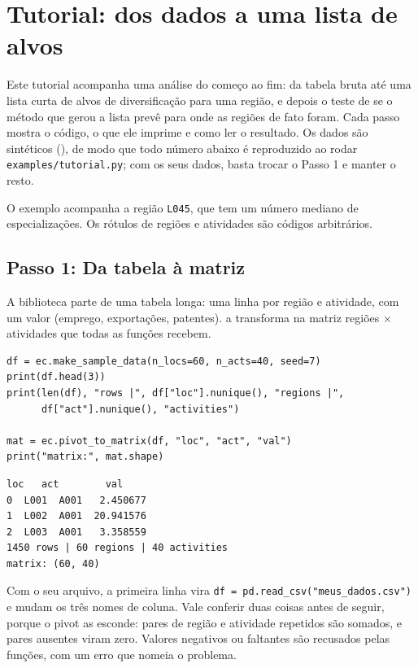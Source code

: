 \section{Tutorial: dos dados a uma lista de alvos}

Este tutorial acompanha uma análise do começo ao fim: da tabela
bruta até uma lista curta de alvos de diversificação para uma região, e
depois o teste de se o método que gerou a lista prevê para onde as
regiões de fato foram. Cada passo mostra o código, o que ele imprime e
como ler o resultado. Os dados são sintéticos
(), de modo que todo número abaixo é reproduzido
ao rodar \texttt{examples/tutorial.py}; com os seus dados, basta trocar o
Passo 1 e manter o resto.

O exemplo acompanha a região \texttt{L045}, que tem um número mediano de
especializações. Os rótulos de regiões e atividades são códigos
arbitrários.

\subsection{Passo 1: Da tabela à matriz}

A biblioteca parte de uma tabela longa: uma linha por região e
atividade, com um valor (emprego, exportações, patentes).
 a transforma na matriz regiões $\times$
atividades que todas as funções recebem.

\begin{lstlisting}
df = ec.make_sample_data(n_locs=60, n_acts=40, seed=7)
print(df.head(3))
print(len(df), "rows |", df["loc"].nunique(), "regions |",
      df["act"].nunique(), "activities")

mat = ec.pivot_to_matrix(df, "loc", "act", "val")
print("matrix:", mat.shape)
\end{lstlisting}
\begin{lstlisting}[language={}, numbers=none, backgroundcolor=\color{white}, frame=leftline, framerule=2pt, rulecolor=\color{noteborder}, xleftmargin=1.5em]
    loc   act        val
0  L001  A001   2.450677
1  L002  A001  20.941576
2  L003  A001   3.358559
1450 rows | 60 regions | 40 activities
matrix: (60, 40)
\end{lstlisting}

Com o seu arquivo, a primeira linha vira
\texttt{df = pd.read\_csv("meus\_dados.csv")} e mudam os três nomes de
coluna. Vale conferir duas coisas antes de seguir, porque o pivot as
esconde: pares de região e atividade repetidos são somados, e pares
ausentes viram zero. Valores negativos ou faltantes são recusados pelas
funções, com um erro que nomeia o problema.

